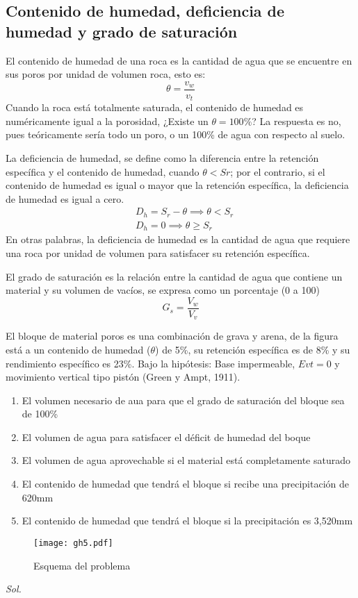 \subsection{Contenido de humedad, deficiencia de humedad y grado de saturación}
El contenido de humedad de una roca es la cantidad de agua que se encuentre en sus poros por unidad de volumen roca, esto es:
\begin{equation}
    \theta = \frac{v_w}{v_t}
\end{equation}
Cuando la roca está totalmente saturada, el contenido de humedad es numéricamente igual a la porosidad, ¿Existe un $\theta= 100\%$? La respuesta es no, pues teóricamente sería todo un poro, o un 100\% de agua con respecto al suelo.

La deficiencia de humedad, se define como la diferencia entre la retención específica y el contenido de humedad, cuando $\theta< Sr$; por el contrario, si el contenido de humedad es igual o mayor que la retención específica, la deficiencia de humedad es igual a cero.
\begin{align}
    &D_h = S_r -\theta\implies\theta <S_r\\
    &D_h = 0 \implies\theta \geq S_r
\end{align}
En otras palabras, la deficiencia de humedad es la cantidad de agua que requiere una roca por unidad de volumen para satisfacer su retención específica.

El grado de saturación es la relación entre la cantidad de agua que contiene un material y su volumen de vacíos, se expresa como un porcentaje (0 a 100)
\begin{equation}
    G_s = \frac{V_w}{V_v}
\end{equation}
\begin{problem}
El bloque de material poros es una combinación de grava y arena, de la figura está a un contenido de humedad ($\theta$) de 5\%, su retención específica es de 8\% y su rendimiento específico es 23\%. Bajo la hipótesis: Base impermeable, $Evt=0$ y movimiento vertical tipo pistón (Green y Ampt, 1911).
\begin{enumerate}
    \item El volumen necesario de aua para que el grado de saturación del bloque sea de 100\%
    \item El volumen de agua para satisfacer el déficit de humedad del boque
    \item El volumen de agua aprovechable si el material está completamente saturado
    \item El contenido de humedad que tendrá el bloque si recibe una precipitación de 620mm
    \item El contenido de humedad que tendrá el bloque si la precipitación es 3,520mm 
\end{enumerate}
\end{problem}
\begin{figure}[h!]
\centering
  \texttt{[image: gh5.pdf]}
  \caption{Esquema del problema}
  \label{gh}
\end{figure}
\textit{ Sol. }

